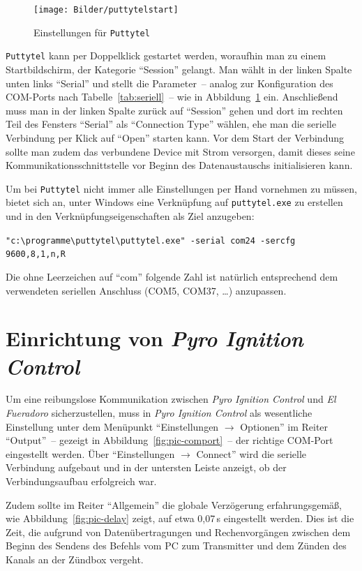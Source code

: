 \documentclass[paper=a4, parskip, numbers=noenddot, toc=listof, headsepline]{scrbook}
\newcommand{\pic}{\emph{Pyro Ignition Control}}
\newcommand{\anlage}{\emph{El Fueradoro}}
\begin{document}
			\begin{figure}
				\centering
				\texttt{[image: Bilder/puttytelstart]}
				\caption{Einstellungen für \texttt{Puttytel}}
				\label{fig:puttytelstart}
			\end{figure}

			\texttt{Puttytel} kann per Doppelklick gestartet werden, woraufhin man zu einem Startbildschirm, der Kategorie \enquote{Session} gelangt. Man wählt in der linken Spalte unten links \enquote{Serial} und stellt die Parameter~-- analog zur Konfiguration des COM-Ports nach Tabelle~\ref{tab:seriell}~-- wie in Abbildung~\ref{fig:puttytelstart} ein. Anschließend muss man in der linken Spalte zurück auf \enquote{Session} gehen und dort im rechten Teil des Fensters \enquote{Serial} als \enquote{Connection Type} wählen, ehe man die serielle Verbindung per Klick auf \enquote{Open} starten kann. Vor dem Start der Verbindung sollte man zudem das verbundene Device mit Strom versorgen, damit dieses seine Kommunikationsschnittstelle vor Beginn des Datenaustauschs initialisieren kann.

			Um bei \texttt{Puttytel} nicht immer alle Einstellungen per Hand vornehmen zu müssen, bietet sich an, unter Windows eine Verknüpfung auf \texttt{puttytel.exe} zu erstellen und in den Ver\-knüpfungs\-eigen\-schaften als Ziel anzugeben:
			\begin{center}
				\verb|"c:\programme\puttytel\puttytel.exe" -serial com24 -sercfg 9600,8,1,n,R|
			\end{center}

			Die ohne Leerzeichen auf \enquote{com} folgende Zahl ist natürlich entsprechend dem verwendeten seriellen Anschluss (COM5, COM37, \dots) anzupassen.

		\section{Einrichtung von \pic}
			\label{sec:piceinrichtung}

			Um eine reibungslose Kommunikation zwischen {\pic} und {\anlage} sicherzustellen, muss in {\pic} als wesentliche Einstellung unter dem Menüpunkt \enquote{Einstellungen $\rightarrow$ Optionen} im Reiter \enquote{Output}~-- gezeigt in Abbildung~\ref{fig:pic-comport}~-- der richtige COM-Port eingestellt werden. Über \enquote{Einstellungen $\rightarrow$ Connect} wird die serielle Verbindung aufgebaut und in der untersten Leiste anzeigt, ob der Verbindungsaufbau erfolgreich war.

			Zudem sollte im Reiter \enquote{Allgemein} die globale Verzögerung erfahrungsgemäß, wie Abbildung~\ref{fig:pic-delay} zeigt, auf etwa 0,07\,s eingestellt werden. Dies ist die Zeit, die aufgrund von Datenübertragungen und Rechenvorgängen zwischen dem Beginn des Sendens des Befehls vom PC zum Transmitter und dem Zünden des Kanals an der Zündbox vergeht.
\end{document}
